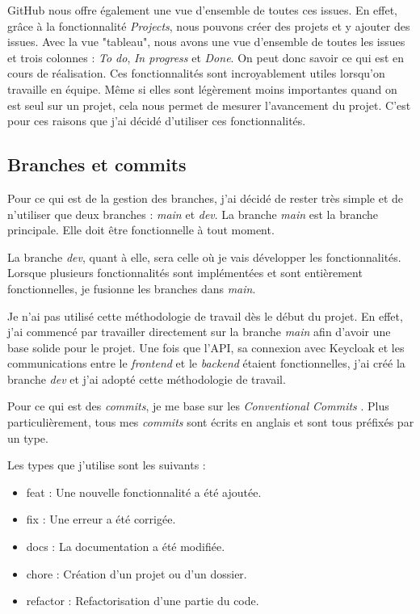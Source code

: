 GitHub nous offre également une vue d'ensemble de toutes ces issues. En effet, grâce à la fonctionnalité \emph{Projects}, nous pouvons créer des projets et y ajouter des issues. Avec la vue "tableau", nous avons une vue d'ensemble de toutes les issues et trois colonnes : \emph{To do}, \emph{In progress} et \emph{Done}. On peut donc savoir ce qui est en cours de réalisation. Ces fonctionnalités sont incroyablement utiles lorsqu'on travaille en équipe. Même si elles sont légèrement moins importantes quand on est seul sur un projet, cela nous permet de mesurer l'avancement du projet. C'est pour ces raisons que j'ai décidé d'utiliser ces fonctionnalités.

\subsection{Branches et commits}
Pour ce qui est de la gestion des branches, j'ai décidé de rester très simple et de n'utiliser que deux branches : \emph{main} et \emph{dev}. La branche \emph{main} est la branche principale. Elle doit être fonctionnelle à tout moment.

La branche \emph{dev}, quant à elle, sera celle où je vais développer les fonctionnalités. Lorsque plusieurs fonctionnalités sont implémentées et sont entièrement fonctionnelles, je fusionne les branches dans \emph{main}.

Je n'ai pas utilisé cette méthodologie de travail dès le début du projet. En effet, j'ai commencé par travailler directement sur la branche \emph{main} afin d'avoir une base solide pour le projet. Une fois que l'API, sa connexion avec Keycloak et les communications entre le \emph{frontend} et le \emph{backend} étaient fonctionnelles, j'ai créé la branche \emph{dev} et j'ai adopté cette méthodologie de travail.

Pour ce qui est des \emph{commits}, je me base sur les \emph{Conventional Commits} \cite{ConventionalCommits}. Plus particulièrement, tous mes \emph{commits} sont écrits en anglais et sont tous préfixés par un type.

Les types que j'utilise sont les suivants :
\begin{itemize}
    \item feat : Une nouvelle fonctionnalité a été ajoutée.
    \item fix : Une erreur a été corrigée.
    \item docs : La documentation a été modifiée.
    \item chore : Création d'un projet ou d'un dossier.
    \item refactor : Refactorisation d'une partie du code.
\end{itemize}

